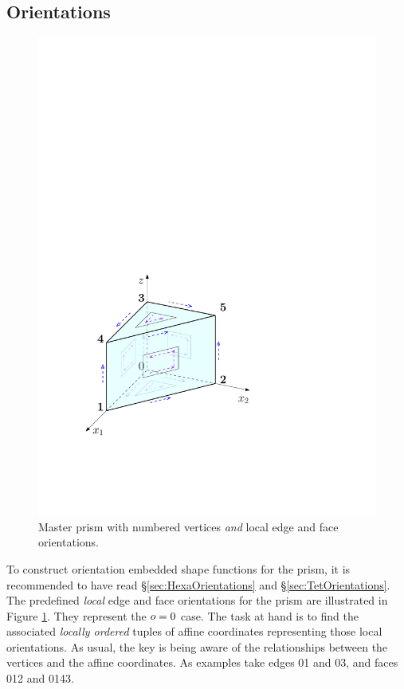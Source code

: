 \subsection{Orientations}
\label{sec:PrismOrientations}

\begin{figure}[!ht]
\begin{center}
\includegraphics[scale=0.5]{./figures/MasterPrismOrientations.pdf}
\caption{Master prism with numbered vertices \textit{and} local edge and face orientations.}
\label{fig:MasterPrismOrientations}
\end{center}
\end{figure}

To construct orientation embedded shape functions for the prism, it is recommended to have read \S\ref{sec:HexaOrientations} and \S\ref{sec:TetOrientations}.
The predefined \textit{local} edge and face orientations for the prism are illustrated in Figure \ref{fig:MasterPrismOrientations}.
They represent the $o=0$ case.
The task at hand is to find the associated \textit{locally ordered} tuples of affine coordinates representing those local orientations.
As usual, the key is being aware of the relationships between the vertices and the affine coordinates.
As examples take edges 01 and 03, and faces 012 and 0143.

